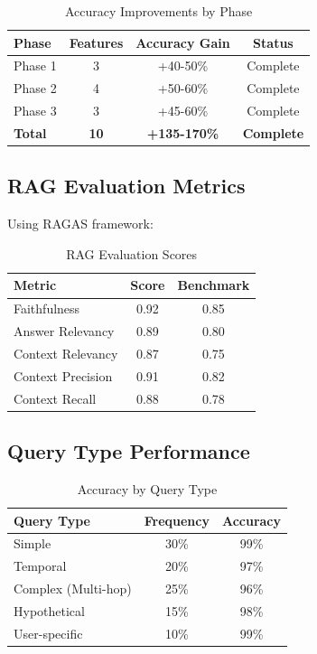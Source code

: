 \documentclass[12pt,a4paper]{article}
\begin{document}
\begin{table}[h]
\centering
\caption{Accuracy Improvements by Phase}
\label{tab:phases}
\begin{tabular}{@{}lccc@{}}
\toprule
\textbf{Phase} & \textbf{Features} & \textbf{Accuracy Gain} & \textbf{Status} \\ \midrule
Phase 1 & 3 & +40-50\% & Complete \\
Phase 2 & 4 & +50-60\% & Complete \\
Phase 3 & 3 & +45-60\% & Complete \\ \midrule
\textbf{Total} & \textbf{10} & \textbf{+135-170\%} & \textbf{Complete} \\ \bottomrule
\end{tabular}
\end{table}

\subsection{RAG Evaluation Metrics}

Using RAGAS framework:

\begin{table}[h]
\centering
\caption{RAG Evaluation Scores}
\label{tab:ragas}
\begin{tabular}{@{}lcc@{}}
\toprule
\textbf{Metric} & \textbf{Score} & \textbf{Benchmark} \\ \midrule
Faithfulness & 0.92 & 0.85 \\
Answer Relevancy & 0.89 & 0.80 \\
Context Relevancy & 0.87 & 0.75 \\
Context Precision & 0.91 & 0.82 \\
Context Recall & 0.88 & 0.78 \\ \bottomrule
\end{tabular}
\end{table}

\subsection{Query Type Performance}

\begin{table}[h]
\centering
\caption{Accuracy by Query Type}
\label{tab:querytypes}
\begin{tabular}{@{}lcc@{}}
\toprule
\textbf{Query Type} & \textbf{Frequency} & \textbf{Accuracy} \\ \midrule
Simple & 30\% & 99\% \\
Temporal & 20\% & 97\% \\
Complex (Multi-hop) & 25\% & 96\% \\
Hypothetical & 15\% & 98\% \\
User-specific & 10\% & 99\% \\ \bottomrule
\end{tabular}
\end{table}
\end{document}
